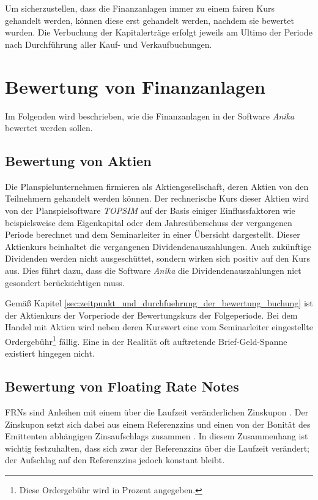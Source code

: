 \documentclass[12pt, a4paper]{article}
\theoremstyle{plain}
\begin{document}
Um sicherzustellen, dass die Finanzanlagen immer zu einem fairen Kurs gehandelt werden, können diese erst gehandelt werden, nachdem sie bewertet wurden. 
Die Verbuchung der Kapitalerträge erfolgt jeweils am Ultimo der Periode nach Durchführung aller Kauf- und Verkaufbuchungen.

\section{Bewertung von Finanzanlagen}
\label{sec:bewertung_von_finanzanlagen}
Im Folgenden wird beschrieben, wie die Finanzanlagen in der Software \textit{Anika} bewertet werden sollen.

\subsection{Bewertung von Aktien}
\label{sec:bewertung_von_aktien}
Die Planspielunternehmen firmieren als Aktiengesellschaft, deren Aktien von den Teilnehmern gehandelt werden können.
Der rechnerische Kurs dieser Aktien wird von der Planspielsoftware \textit{TOPSIM} auf der Basis einiger Einflussfaktoren wie beispielsweise dem Eigenkapital oder dem Jahresüberschuss der vergangenen Periode berechnet und dem Seminarleiter in einer Übersicht dargestellt.
Dieser Aktienkurs beinhaltet die vergangenen Dividendenauszahlungen. Auch zukünftige Dividenden werden nicht ausgeschüttet, sondern wirken sich positiv auf den Kurs aus. Dies führt dazu, dass die Software \textit{Anika} die Dividendenauszahlungen nict gesondert berücksichtigen muss.

Gemäß Kapitel \ref{sec:zeitpunkt_und_durchfuehrung_der_bewertung_buchung} ist der Aktienkurs der Vorperiode der Bewertungskurs der Folgeperiode.
Bei dem Handel mit Aktien wird neben deren Kurswert eine vom Seminarleiter eingestellte Ordergebühr\footnote{Diese Ordergebühr wird in Prozent angegeben.} fällig. Eine in der Realität oft auftretende Brief-Geld-Spanne existiert hingegen nicht.

\subsection{Bewertung von Floating Rate Notes}
\label{sec:bewertung_von_floating_rate_notes}
\glspl{FRN} sind Anleihen mit einem über die Laufzeit veränderlichen Zinskupon \autocite[][373]{fabozzi_handbook_2005}. Der Zinskupon setzt sich dabei aus einem Referenzzins und einen von der Bonität des Emittenten abhängigen Zinsaufschlags zusammen \autocite[][374]{fabozzi_handbook_2005}. In diesem Zusammenhang ist wichtig festzuhalten, dass sich zwar der Referenzzins über die Laufzeit verändert; der Aufschlag auf den Referenzzins jedoch konstant bleibt.
\end{document}
